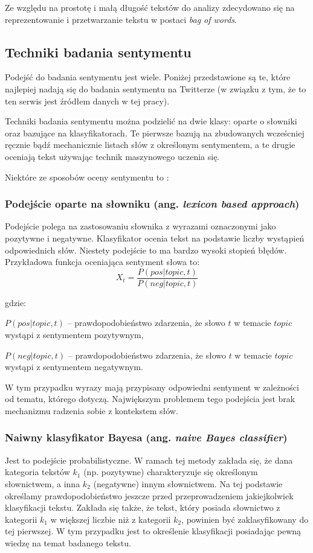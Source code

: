 Ze względu na prostotę i małą długość tekstów do analizy zdecydowano się
na reprezentowanie i przetwarzanie tekstu w postaci \textit{bag of words}.






\subsection{Techniki badania sentymentu}
Podejść do badania sentymentu jest wiele. Poniżej przedstawione są te, które
najlepiej nadają się do badania sentymentu na Twitterze (w związku z tym, że to
ten serwis jest źródłem danych w tej pracy).

Techniki badania sentymentu można podzielić na dwie klasy: oparte o słowniki
oraz bazujące na klasyfikatorach. Te pierwsze bazują na zbudowanych wcześcniej
ręcznie bądź mechanicznie listach słów z określonym sentymentem,
a te drugie oceniają tekst używając technik maszynowego uczenia się.

Niektóre ze sposobów oceny sentymentu to \cite{sentimentTechniques}:

\subsubsection{Podejście oparte na słowniku (ang. \textit{lexicon based approach})}
Podejście polega na zastosowaniu słownika z wyrazami oznaczonymi jako pozytywne
i negatywne. Klasyfikator ocenia tekst na podstawie liczby wystąpień
odpowiednich słów. Niestety podejście to ma bardzo wysoki stopień błędów.
Przykładowa funkcja oceniająca sentyment słowa to:
\begin{equation}
X_t = \frac{P(pos | topic, t)}{P(neg | topic, t)}
\end{equation}

gdzie:

$P(pos | topic, t)$ -- prawdopodobieństwo zdarzenia, że słowo $t$ w temacie 
$topic$ wystąpi z sentymentem pozytywnym,

$P(neg | topic, t)$ -- prawdopodobieństwo zdarzenia, że słowo $t$ w temacie
$topic$ wystąpi z sentymentem negatywnym.

\bigskip


W tym przypadku wyrazy mają przypisany odpowiedni sentyment w zależności od
tematu, którego dotyczą. Największym problemem tego podejścia jest brak
mechanizmu radzenia sobie z kontekstem słów.

\subsubsection{Naiwny klasyfikator Bayesa (ang. \textit{naive Bayes classifier})}
Jest to podejście probabilistyczne. W ramach tej metody zakłada się, że dana kategoria
tekstów $k_1$ (np. pozytywne) charakteryzuje się określonym słownictwem, 
a inna $k_2$ (negatywne) innym słownictwem. 
Na tej podstawie określamy prawdopodobieństwo jeszcze przed przeprowadzeniem
jakiejkolwiek klasyfikacji tekstu. Zakłada się także, że tekst, który posiada
słownictwo z kategorii $k_1$ w większej liczbie niż z kategorii $k_2$, powinien
być zaklasyfikowany do tej pierwszej. 
W tym przypadku jest to określenie klasyfikacji posiadając pewną wiedzę na temat
badanego tekstu.

